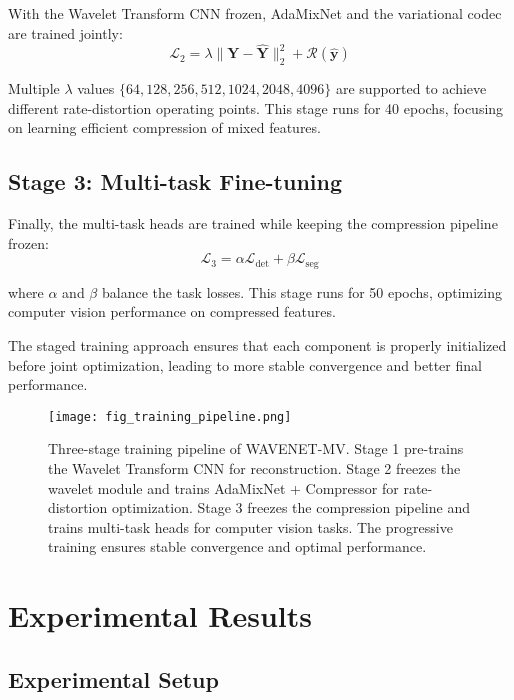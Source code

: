 \documentclass[conference]{IEEEtran}
\begin{document}
With the Wavelet Transform CNN frozen, AdaMixNet and the variational codec are trained jointly:
\begin{equation}
\mathcal{L}_2 = \lambda \|\mathbf{Y} - \hat{\mathbf{Y}}\|_2^2 + \mathcal{R}(\hat{\mathbf{y}})
\end{equation}

Multiple $\lambda$ values $\{64, 128, 256, 512, 1024, 2048, 4096\}$ are supported to achieve different rate-distortion operating points. This stage runs for 40 epochs, focusing on learning efficient compression of mixed features.

\subsection{Stage 3: Multi-task Fine-tuning}

Finally, the multi-task heads are trained while keeping the compression pipeline frozen:
\begin{equation}
\mathcal{L}_3 = \alpha \mathcal{L}_{\text{det}} + \beta \mathcal{L}_{\text{seg}}
\end{equation}

where $\alpha$ and $\beta$ balance the task losses. This stage runs for 50 epochs, optimizing computer vision performance on compressed features.

The staged training approach ensures that each component is properly initialized before joint optimization, leading to more stable convergence and better final performance.

\begin{figure}[htbp]
\centerline{\texttt{[image: fig\_training\_pipeline.png]}}
\caption{Three-stage training pipeline of WAVENET-MV. Stage 1 pre-trains the Wavelet Transform CNN for reconstruction. Stage 2 freezes the wavelet module and trains AdaMixNet + Compressor for rate-distortion optimization. Stage 3 freezes the compression pipeline and trains multi-task heads for computer vision tasks. The progressive training ensures stable convergence and optimal performance.}
\label{fig:training}
\end{figure}

\section{Experimental Results}

\subsection{Experimental Setup}
\end{document}

